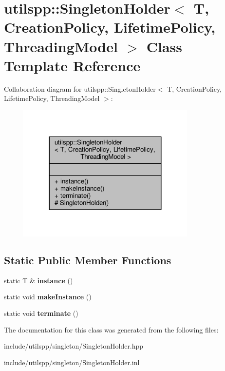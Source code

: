 \hypertarget{classutilspp_1_1SingletonHolder}{\section{utilspp\-:\-:Singleton\-Holder$<$ T, Creation\-Policy, Lifetime\-Policy, Threading\-Model $>$ Class Template Reference}
\label{classutilspp_1_1SingletonHolder}
}


Collaboration diagram for utilspp\-:\-:Singleton\-Holder$<$ T, Creation\-Policy, Lifetime\-Policy, Threading\-Model $>$\-:
\nopagebreak
\begin{figure}[H]
\begin{center}
\leavevmode
\includegraphics[width=252pt]{classutilspp_1_1SingletonHolder__coll__graph}
\end{center}
\end{figure}
\subsection*{Static Public Member Functions}
\begin{DoxyCompactItemize}
\item 
\hypertarget{classutilspp_1_1SingletonHolder_ac47481d775e3aa69b5bdba9a159f2322}{static T \& {\bfseries instance} ()}\label{classutilspp_1_1SingletonHolder_ac47481d775e3aa69b5bdba9a159f2322}

\item 
\hypertarget{classutilspp_1_1SingletonHolder_ad3d625b25955487f61a652a2c5944787}{static void {\bfseries make\-Instance} ()}\label{classutilspp_1_1SingletonHolder_ad3d625b25955487f61a652a2c5944787}

\item 
\hypertarget{classutilspp_1_1SingletonHolder_a67c0f4b310db8f3d069f7695841b53c6}{static void {\bfseries terminate} ()}\label{classutilspp_1_1SingletonHolder_a67c0f4b310db8f3d069f7695841b53c6}

\end{DoxyCompactItemize}


The documentation for this class was generated from the following files\-:\begin{DoxyCompactItemize}
\item 
include/utilspp/singleton/Singleton\-Holder.\-hpp\item 
include/utilspp/singleton/Singleton\-Holder.\-inl\end{DoxyCompactItemize}
